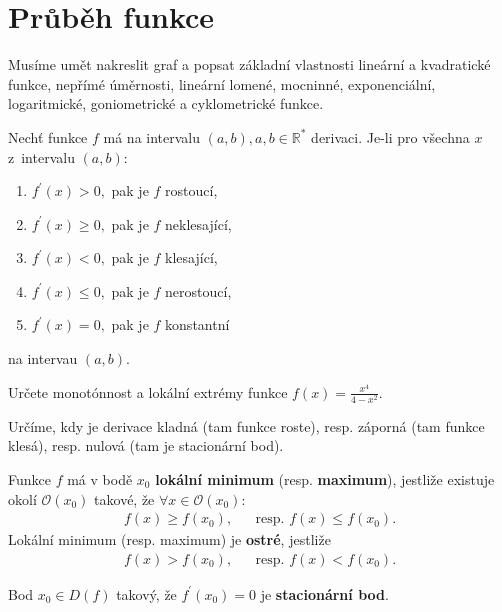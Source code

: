 \section{Průběh funkce}
\begin{pozn}
    Musíme umět nakreslit graf a popsat základní vlastnosti lineární a
    kvadratické funkce, nepřímé úměrnosti, lineární lomené, mocninné, exponenciální,
    logaritmické, goniometrické a cyklometrické funkce.
\end{pozn}

\begin{veta}
Nechť funkce $f$ má na intervalu $(a,b),a,b\in \mathbb R^*$ derivaci. Je-li pro
všechna $x$ z~intervalu $(a,b)$:
\begin{enumerate}[$i.$]
\item $f^\prime(x)>0,$ pak je $f$ rostoucí,
\item $f^\prime(x)\geq 0,$ pak je $f$ neklesající,
\item $f^\prime(x)<0,$ pak je $f$ klesající,
\item $f^\prime(x) \leq 0,$ pak je $f$ nerostoucí,
\item $f^\prime(x)=0,$ pak je $f$ konstantní
\end{enumerate}
na intervau $(a,b).$
\end{veta}

\begin{priklad}
Určete monotónnost a lokální extrémy funkce $f(x)=\frac{x^4}{4-x^2}$.
\end{priklad}

\begin{reseni}
Určíme, kdy je derivace kladná (tam funkce roste), resp. záporná (tam funkce klesá),
resp. nulová (tam je stacionární bod).
\end{reseni}

\begin{definition}
Funkce $f$ má v bodě $x_0$ \textbf{lokální minimum} (resp. \textbf{maximum}),
jestliže existuje okolí $\mathscr O(x_0)$ takové, že $\forall x \in \mathscr O(x_0):$
\begin{align*}
    f(x)\geq f(x_0), & & \textrm{resp. } f(x)\leq f(x_0).
\end{align*}
Lokální minimum (resp. maximum) je \textbf{ostré}, jestliže
\begin{align*}
    f(x)> f(x_0), & & \textrm{resp. } f(x)<f(x_0).
\end{align*}
\end{definition}

\begin{definition}
Bod $x_0\in D(f)$ takový, že $f^\prime(x_0)=0$ je \textbf{stacionární bod}.
\end{definition}

